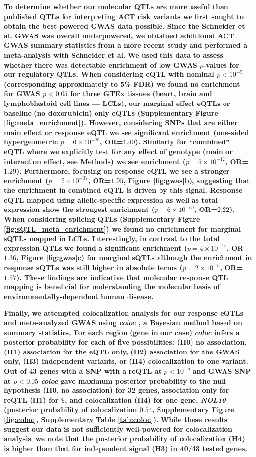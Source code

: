 \documentclass{article}
\newcommand{\tempbold}[1]{\textbf{#1}}
\begin{document}
\tempbold{To determine whether our molecular QTLs are more useful than published QTLs for interpreting ACT risk variants we first sought to obtain the best powered GWAS data possible. Since the Schneider et al. GWAS was overall underpowered, we obtained additional ACT GWAS summary statistics from a more recent study\cite{Serie2017} and performed a meta-analysis with Schneider et al. We used this data to assess whether there was detectable enrichment of low GWAS $p$-values for our regulatory QTLs. When considering eQTL with nominal $p < 10^{-5}$ (corresponding approximately to 5\% FDR) we found no enrichment for GWAS $p<0.05$ for three GTEx tissues (heart, brain and lymphoblastoid cell lines --- LCLs), our marginal effect eQTLs or baseline (no doxorubicin) only eQTLs (Supplementary Figure \ref{fig:meta_enrichment}). However, considering SNPs that are either main effect or response eQTL we see significant enrichment (one-sided hypergeometric $p=6 \times 10^{-20}$, OR=$1.40$). Similarly for ``combined'' eQTL where we explicitly test for any effect of genotype  (main or interaction effect, see Methods) we see enrichment ($p=5 \times 10^{-12}$, OR=$1.29$). Furthermore, focusing on response eQTL we see a stronger enrichment ($p=2 \times 10^{-37}$, OR=$1.95$, Figure \ref{fig:gwas}b), suggesting that the enrichment in combined eQTL is driven by this signal. Response eQTL mapped using allelic-specific expression as well as total expression show the strongest enrichment ($p=6 \times 10^{-60}$, OR=$2.22$). When considering splicing QTLs (Supplementary Figure \ref{fig:sQTL_meta_enrichment}) we found no enrichment for marginal sQTLs mapped in LCLs\cite{li2016rna}. Interestingly, in contrast to the total expression QTLs we found a significant enrichment ($p=4 \times 10^{-17}$, OR=$1.36$, Figure \ref{fig:gwas}c) for marginal sQTLs although the enrichment in response sQTLs was still higher in absolute terms ($p=2 \times 10^{-5}$, OR=$1.57$). These findings are indicative that molecular response QTL mapping is beneficial for understanding the molecular basis of environmentally-dependent human disease.}

\tempbold{Finally, we attempted colocalization analysis for our response eQTLs and meta-analyzed GWAS using \emph{coloc} \cite{Giambartolomei2014-ux}, a Bayesian method based on summary statistics. For each region (gene in our case) \emph{coloc} infers a posterior probability for each of five possibilities: (H0) no association, (H1) association for the eQTL only, (H2) association for the GWAS only, (H3) independent variants, or (H4) colocalization to one variant. Out of 43 genes with a SNP with a reQTL at $p<10^{-5}$ and GWAS SNP at $p<0.05$ \emph{coloc} gave maximum posterior probability to the null hypothesis (H0, no association) for 32 genes, association only for reQTL (H1) for 9, and colocalization (H4) for one gene, \emph{NOL10} (posterior probability of colocalization $0.54$, Supplementary Figure \ref{fig:coloc}, Supplementary Table \ref{tab:coloc}). While these results suggest our data is not sufficiently well-powered for colocalization analysis, we note that the posterior probability of colocalization (H4) is higher than that for independent signal (H3) in 40/43 tested genes.}
\end{document}
